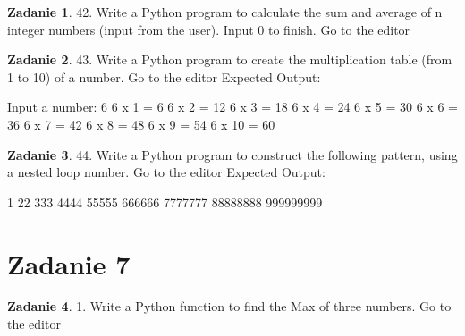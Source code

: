 \documentclass[11pt]{article}
\theoremstyle{definition}
\newtheorem{zadanie}{Zadanie}
\begin{document}
\begin{zadanie}


42. Write a Python program to calculate the sum and average of n integer numbers (input from the user). Input 0 to finish. Go to the editor



\end{zadanie}

\begin{zadanie}


43. Write a Python program to create the multiplication table (from 1 to 10) of a number. Go to the editor
Expected Output:

Input a number: 6                                                       
6 x 1 = 6                                                               
6 x 2 = 12                                                              
6 x 3 = 18                                                              
6 x 4 = 24                                                              
6 x 5 = 30                                                              
6 x 6 = 36                                                              
6 x 7 = 42                                                              
6 x 8 = 48                                                              
6 x 9 = 54                                                              
6 x 10 = 60 



\end{zadanie}

\begin{zadanie}


44. Write a Python program to construct the following pattern, using a nested loop number. Go to the editor
Expected Output:

1
22
333
4444
55555
666666
7777777
88888888
999999999



\end{zadanie}

\section{Zadanie 7}

\begin{zadanie}


1. Write a Python function to find the Max of three numbers. Go to the editor


\end{zadanie}
\end{document}
